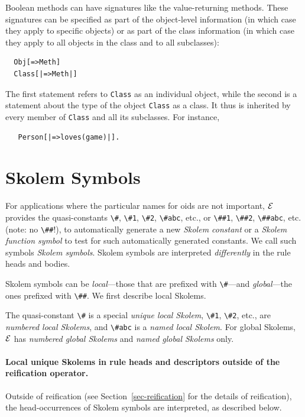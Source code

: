 \documentclass[11pt]{article}
\newcommand{\ERGO}{\mbox{\ensuremath{\cal{E}}\smaller{{\sc{RGO}}}}\xspace}
\newcommand{\FLSYSTEM}{\ERGO}
\begin{document}
Boolean methods can have signatures like the value-returning methods.
These signatures can be specified as part of the object-level information
(in which case they apply to specific objects) or as part of the class
information (in which case they apply to all objects in the class and to
all subclasses):
\begin{verbatim}
  Obj[=>Meth]
  Class[|=>Meth|]
\end{verbatim}
The first statement refers to \texttt{Class} as an individual object, while
the second is a statement about the type of
the object \texttt{Class} as a class.
It thus is inherited by every member of \texttt{Class} and all its
subclasses. 
For instance,
\begin{verbatim}
   Person[|=>loves(game)|].
\end{verbatim}


\section{Skolem Symbols}\label{sec-anon-gen-oids}


%
For applications where the particular names for
oids are not important, \FLSYSTEM provides the
quasi-constants \verb|\#|, \verb|\#1|, \verb|\#2|, \verb|\#abc|, etc.,
or \verb|\##1|, \verb|\##2|, \verb|\##abc|, etc. (note: no \verb|\##|!),
to automatically generate a new
\emph{Skolem constant} or a \emph{Skolem function symbol}
to test for such automatically generated
constants. We call such symbols \emph{Skolem symbols}.   Skolem symbols are
interpreted \emph{differently}
in the rule heads and bodies.

Skolem symbols can be \emph{local}---those that are prefixed with
\verb|\#|---and \emph{global}---the ones prefixed with \verb|\##|.
We first describe local Skolems.

The quasi-constant \verb|\#| is a special \emph{unique local Skolem},
\verb|\#1|, \verb|\#2|, etc., are \emph{numbered local Skolems}, and
\verb|\#abc| is a \emph{named local Skolem}.  
For global Skolems, \FLSYSTEM has \emph{numbered global Skolems} and
\emph{named global Skolems} only.  

\paragraph{Local unique Skolems in rule heads and descriptors outside of the reification
  operator.}
Outside of reification (see
Section~\ref{sec-reification} for the details of reification), the
head-occurrences of Skolem symbols are interpreted, as described below.
\end{document}
